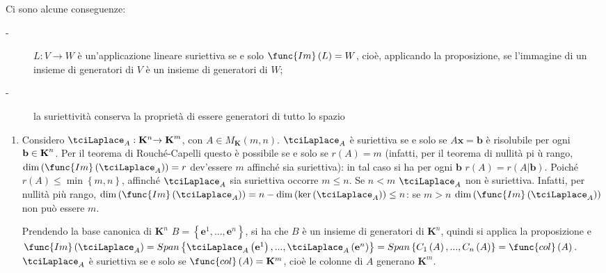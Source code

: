 \documentclass{article}
\begin{document}
Ci sono alcune conseguenze:

\begin{description}
\item[-] $L:V\rightarrow W$ \`{e} un'applicazione lineare suriettiva se e
solo $\func{Im}\left( L\right) =W$, cio\`{e}, applicando la proposizione, se
l'immagine di un insieme di generatori di $V$ \`{e} un insieme di generatori
di $W$;

\item[-] la suriettivit\`{a} conserva la propriet\`{a} di essere generatori
di tutto lo spazio
\end{description}

\begin{enumerate}
\item Considero $\tciLaplace _{A}:\mathbf{K}^{n}\mathbf{\rightarrow K}^{m}$,
con $A\in M_{\mathbf{K}}\left( m,n\right) $. $\tciLaplace _{A}$ \`{e}
suriettiva se e solo se $A\mathbf{x=b}$ \`{e} risolubile per ogni $\mathbf{%
b\in K}^{n}$. Per il teorema di Rouch\'{e}-Capelli questo \`{e} possibile se
e solo se $r\left( A\right) =m$ (infatti, per il teorema di nullit\`{a} pi%
\`{u} rango, $\dim \left( \func{Im}\left( \tciLaplace _{A}\right) \right) =r$
dev'essere $m$ affinch\'{e} sia suriettiva): in tal caso si ha per ogni $%
\mathbf{b}$ $r\left( A\right) =r\left( A|\mathbf{b}\right) $. Poich\'{e} $%
r\left( A\right) \leq \min \left\{ m,n\right\} $, affinch\'{e} $\tciLaplace
_{A}$ sia suriettiva occorre $m\leq n$. Se $n<m$ $\tciLaplace _{A}$ non \`{e}
suriettiva. Infatti, per nullit\`{a} pi\`{u} rango, $\dim \left( \func{Im}%
\left( \tciLaplace _{A}\right) \right) =n-\dim \left( \ker \left(
\tciLaplace _{A}\right) \right) \leq n$: se $m>n$ $\dim \left( \func{Im}%
\left( \tciLaplace _{A}\right) \right) $ non pu\`{o} essere $m$.

Prendendo la base canonica di $\mathbf{K}^{n}$ $B=\left\{ \mathbf{e}^{1}%
\mathbf{,...,e}^{n}\right\} $, si ha che $B$ \`{e} un insieme di generatori
di $\mathbf{K}^{n}$, quindi si applica la proposizione e $\func{Im}\left(
\tciLaplace _{A}\right) =Span\left\{ \tciLaplace _{A}\left( \mathbf{e}%
^{1}\right) ,...,\tciLaplace _{A}\left( \mathbf{e}^{n}\right) \right\}
=Span\left\{ C_{1}\left( A\right) ,...,C_{n}\left( A\right) \right\} =\func{%
col}\left( A\right) $. $\tciLaplace _{A}$ \`{e} suriettiva se e solo se $%
\func{col}\left( A\right) =\mathbf{K}^{m}$, cio\`{e} le colonne di $A$
generano $\mathbf{K}^{m}$.
\end{enumerate}
\end{document}

